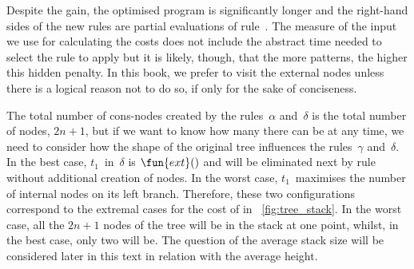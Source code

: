 Despite the gain, the optimised program is significantly longer and
the right\hyp{}hand sides of the new rules are partial
evaluations of
rule~\clause{\delta}. The measure of the input we use for calculating
the costs does not include the abstract time needed to select the rule
to apply but it is likely, though, that the more patterns, the higher
this hidden penalty. In this book, we prefer to visit the external
nodes unless there is a logical reason not to do so, if only for the
sake of conciseness.

The total number of cons\hyp{}nodes created by the
rules~\(\alpha\) and~\(\delta\) is the total number of nodes,
\(2n+1\), but if we want to know how many there can be at any time, we
need to consider how the shape of the original tree influences the
rules~\(\gamma\) and~\(\delta\). In the best case,
\(t_1\)~in~\(\delta\) is \(\fun{ext}()\) and will be eliminated next
by rule~\clause{\gamma} without additional creation of nodes. In the
worst case, \(t_1\)~maximises the number of internal nodes on its left
branch. Therefore, these two configurations correspond to the extremal
cases for the cost of 
in \fig~\vref{fig:tree_stack}. In the worst case, all the \(2n+1\)
nodes of the tree will be in the stack at one point, whilst, in the
best case, only two will be. The question of the average stack size
will be considered later in this text in relation with the average
height.

